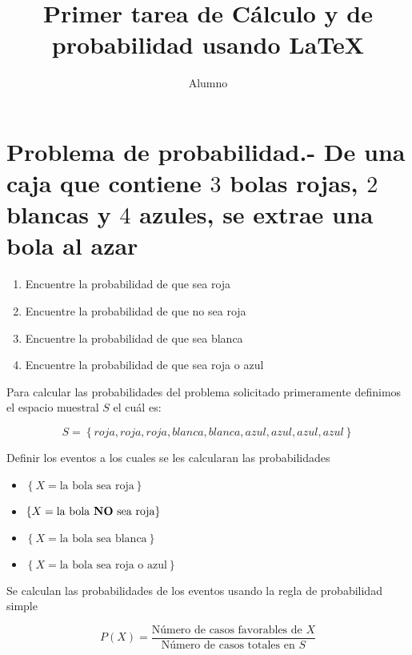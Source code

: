 \documentclass{article} %
\title{Primer tarea de Cálculo y de probabilidad usando \LaTeX}
\author{Alumno}
\date{ }
\begin{document}
\sloppy
\pagestyle{empty}
\maketitle
\thispagestyle{empty}
\section*{Problema de probabilidad.- De una caja que contiene $3$ bolas rojas,
$2$ blancas y $4$ azules, se extrae una bola al azar}  

\begin{enumerate}
    \item Encuentre la probabilidad de que sea roja
    \item Encuentre la probabilidad de que no sea roja
    \item Encuentre la probabilidad de que sea blanca
    \item Encuentre la probabilidad de que sea roja o azul
\end{enumerate}

\noindent Para calcular las probabilidades del problema solicitado
primeramente definimos el espacio muestral $S$ el cuál es:

\bigskip

\begin{equation*}
    S = \left\{roja, roja, roja, blanca, blanca, azul, azul, azul, azul\right\}
\end{equation*}

\bigskip

\noindent Definir los eventos a los cuales se les calcularan las probabilidades

\begin{itemize}
    \item $\left\{ X=\text{la bola sea roja}\right\} $

    \item $\left\{ X=\text{la bola \textbf{NO} sea roja}\right\} $

    \item $\left\{ X=\text{la bola sea blanca}\right\} $

    \item $\left\{ X=\text{la bola sea roja o azul}\right\} $
\end{itemize}

\noindent Se calculan las probabilidades de los eventos usando la regla de probabilidad simple

\begin{equation*}
    P(X)= \frac{\text{Número de casos favorables de }X}{\text{Número de casos totales en }S}
\end{equation*}
\end{document}
